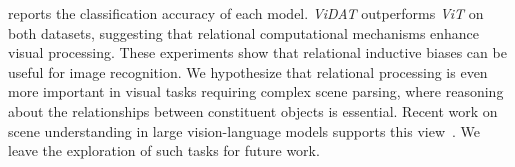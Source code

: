 \begin{table}[bh]
    \centering
    
    \caption{Classification accuracy on image recognition with the CIFAR-10 and CIFAR-100 datasets. Each training configuration is repeated 10 times with different random seeds; we report the mean accuracy $\pm$ the standard error of mean. \textit{DAT} outperforms a standard Vision Transformer, suggesting that relational computational mechanisms are useful for visual processing tasks.}\label{tab:cifar_results}
\end{table}

 reports the classification accuracy of each model. \textit{ViDAT} outperforms \textit{ViT} on both datasets, suggesting that relational computational mechanisms enhance visual processing. These experiments show that relational inductive biases can be useful for image recognition. We hypothesize that relational processing is even more important in visual tasks requiring complex scene parsing, where reasoning about the relationships between constituent objects is essential. Recent work on scene understanding in large vision-language models supports this view~\citep{johnson2017clevr,zerroug2022benchmark,zhao2024benchmarking}. We leave the exploration of such tasks for future work.






